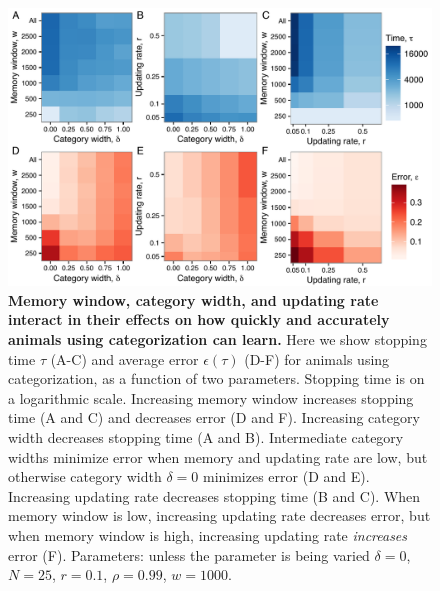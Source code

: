 \begin{figure}[ht]
\includegraphics[width=6.85in]{figures/parameters_interactions_full.pdf}
\caption{\sffamily\small\textbf{Memory window, category width, and updating rate interact in their effects on how quickly and accurately animals using categorization can learn.}
Here we show stopping time $\tau$ (A-C) and average error $\epsilon(\tau)$ (D-F) for animals using categorization, as a function of two parameters. Stopping time is on a logarithmic scale. Increasing memory window increases stopping time (A and C) and decreases error (D and F). Increasing category width decreases stopping time (A and B). Intermediate category widths minimize error when memory and updating rate are low, but otherwise category width $\delta=0$ minimizes error (D and E). Increasing updating rate decreases stopping time (B and C). When memory window is low, increasing updating rate decreases error, but when memory window is high, increasing updating rate \emph{increases} error (F). Parameters: unless the parameter is being varied $\delta = 0$, $N=25$, $r=0.1$, $\rho=0.99$, $w=1000$. 
}
\label{interactions}
\end{figure}

